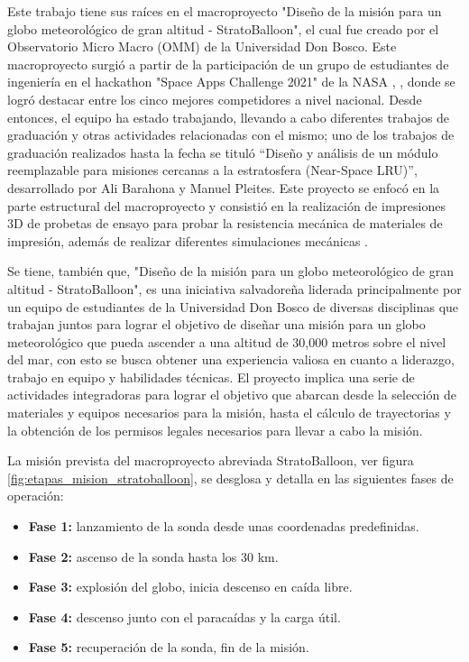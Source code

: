 Este trabajo tiene sus raíces en el macroproyecto "Diseño de la misión para un globo meteorológico de gran altitud - StratoBalloon", el cual fue creado por el Observatorio Micro Macro (OMM) de la Universidad Don Bosco. Este macroproyecto surgió a partir de la participación de un grupo de estudiantes de ingeniería en el hackathon "Space Apps Challenge 2021" de la NASA \cite{SpaceApps_ASAUDB}, \cite{SpacaApps_noticia_UDB}, donde se logró destacar entre los cinco mejores competidores a nivel nacional. Desde entonces, el equipo ha estado trabajando, llevando a cabo diferentes trabajos de graduación y otras actividades relacionadas con el mismo; uno de los trabajos de graduación realizados hasta la fecha se tituló “Diseño y análisis de un módulo reemplazable para misiones cercanas a la estratosfera (Near-Space LRU)”, desarrollado por Ali Barahona y Manuel Pleites. Este proyecto se enfocó en la parte estructural del macroproyecto y consistió en la realización de impresiones 3D de probetas de ensayo para probar la resistencia mecánica de materiales de impresión, además de realizar diferentes simulaciones mecánicas \cite{tesis_estructura_stratoballoon}.

Se tiene, también que,  "Diseño de la misión para un globo meteorológico de gran altitud - StratoBalloon", es una iniciativa salvadoreña liderada principalmente por un equipo de estudiantes de la Universidad Don Bosco de diversas disciplinas que trabajan juntos para lograr el objetivo de diseñar una misión para un globo meteorológico que pueda ascender a una altitud de 30,000 metros sobre el nivel del mar, con esto se busca obtener una experiencia valiosa en cuanto a liderazgo, trabajo en equipo y habilidades técnicas. El proyecto implica una serie de actividades integradoras para lograr el objetivo que abarcan desde la selección de materiales y equipos necesarios para la misión, hasta el cálculo de trayectorias y la obtención de los permisos legales necesarios para llevar a cabo la misión. 

La misión prevista del macroproyecto abreviada StratoBalloon, ver figura \ref{fig:etapas_mision_stratoballoon},  se desglosa y detalla en las siguientes fases de operación:

\begin{itemize}
    \item \textbf{Fase 1:}  lanzamiento de la sonda desde unas coordenadas predefinidas.
    \item \textbf{Fase 2:} ascenso de la sonda hasta los 30 km.
    \item  \textbf{Fase 3:} explosión del globo, inicia descenso en caída libre.
    \item \textbf{Fase 4:} descenso junto con el paracaídas y la carga útil.
    \item \textbf{Fase 5:}  recuperación de la sonda, fin de la misión.
\end{itemize}

